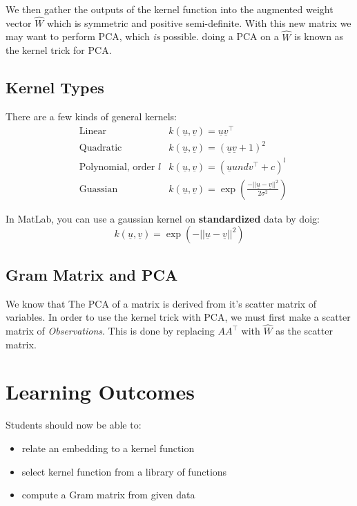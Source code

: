 \documentclass[12pt]{book}
\newcommand{\und}{%
        \underline
}
\begin{document}
We then gather the outputs of the kernel function into the augmented weight
vector $\hat W$ which is symmetric and positive semi-definite. With
this new matrix we may want to perform PCA, which \textit{is} possible.
doing a PCA on a $\hat W$ is known as the kernel trick for PCA.

\subsection*{Kernel Types}
There are a few kinds of general kernels:
\begin{align*}
        &\text{Linear} &k(\und u, \und v) = \und u\und v^\top\\
        &\text{Quadratic} &k(\und u, \und v) = (\und u \und v + 1)^2\\
        &\text{Polynomial, order $l$} &k(\und u, \und v) = (\und u und v^\top + c)^l\\
        &\text{Guassian} &k(\und u, \und v) = \exp(\frac{-||\und u - \und v||^2}{2\sigma^2})
\end{align*}

In MatLab, you can use a gaussian kernel on \textbf{standardized} data by
doig:
\[k(\und u, \und v) = \exp(-||\und u - \und v||^2)\]

\subsection*{Gram Matrix and PCA}
We know that The PCA of a matrix is derived from it's scatter matrix
of variables. In order to use the kernel trick with PCA, we must first 
make a scatter matrix of \textit{Observations}. This is done by replacing
$AA^\top$ with $\hat W$ as the scatter matrix.

\section*{Learning Outcomes}
Students should now be able to:
\begin{itemize}
        \item relate an embedding to a kernel function
        \item select kernel function from a library of functions
        \item compute a Gram matrix from given data
\end{itemize}
\end{document}

